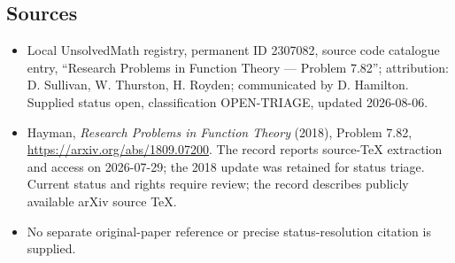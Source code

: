 \documentclass[11pt]{article}
\begin{document}
\subsection{Sources}
\begin{itemize}
\item Local UnsolvedMath registry, permanent ID 2307082, source code catalogue entry, ``Research Problems in Function Theory --- Problem 7.82''; attribution: D. Sullivan, W. Thurston, H. Royden; communicated by D. Hamilton. Supplied status open, classification OPEN-TRIAGE, updated 2026-08-06.
\item Hayman, \emph{Research Problems in Function Theory} (2018), Problem 7.82, \url{https://arxiv.org/abs/1809.07200}. The record reports source-TeX extraction and access on 2026-07-29; the 2018 update was retained for status triage. Current status and rights require review; the record describes publicly available arXiv source TeX.
\item No separate original-paper reference or precise status-resolution citation is supplied.
\end{itemize}
\end{document}
